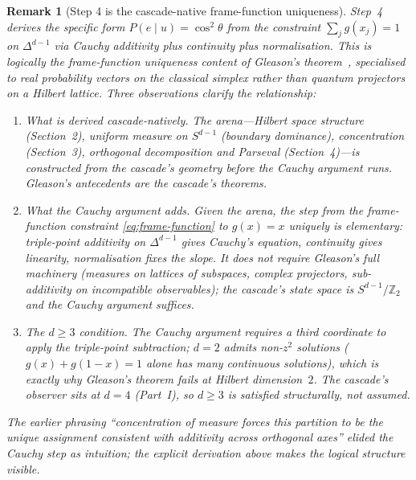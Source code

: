 \documentclass[12pt,a4paper]{article}
\newtheorem{remark}[theorem]{Remark}
\begin{document}
\begin{remark}[Step 4 is the cascade-native frame-function uniqueness]\label{rem:sp15-status}
Step~4 derives the specific form $P(e\mid u) = \cos^2\theta$ from the
constraint $\sum_j g(x_j) = 1$ on $\Delta^{d-1}$ via Cauchy additivity
plus continuity plus normalisation. This is logically the
\emph{frame-function uniqueness} content of Gleason's
theorem~\cite{gleason}, specialised to real probability vectors on the
classical simplex rather than quantum projectors on a Hilbert
lattice. Three observations clarify the relationship:
\begin{enumerate}
\item \emph{What is derived cascade-natively.} The arena---Hilbert space
structure (Section~2), uniform measure on $S^{d-1}$ (boundary dominance),
concentration (Section~3), orthogonal decomposition and Parseval
(Section~4)---is constructed from the cascade's geometry before the
Cauchy argument runs. Gleason's antecedents are the cascade's theorems.
\item \emph{What the Cauchy argument adds.} Given the arena, the step
from the frame-function constraint \eqref{eq:frame-function} to
$g(x) = x$ uniquely is elementary: triple-point additivity on
$\Delta^{d-1}$ gives Cauchy's equation, continuity gives linearity,
normalisation fixes the slope. It does not require Gleason's full
machinery (measures on lattices of subspaces, complex projectors,
sub-additivity on incompatible observables); the cascade's state space
is $S^{d-1}/\mathbb{Z}_2$ and the Cauchy argument suffices.
\item \emph{The $d\geq 3$ condition.} The Cauchy argument requires a
third coordinate to apply the triple-point subtraction; $d=2$ admits
non-$z^2$ solutions ($g(x) + g(1-x) = 1$ alone has many continuous
solutions), which is exactly why Gleason's theorem fails at Hilbert
dimension~$2$. The cascade's observer sits at $d=4$ (Part~I), so
$d \geq 3$ is satisfied structurally, not assumed.
\end{enumerate}
The earlier phrasing ``concentration of measure forces this partition
to be the unique assignment consistent with additivity across
orthogonal axes'' elided the Cauchy step as intuition; the explicit
derivation above makes the logical structure visible.
\end{remark}
\end{document}
